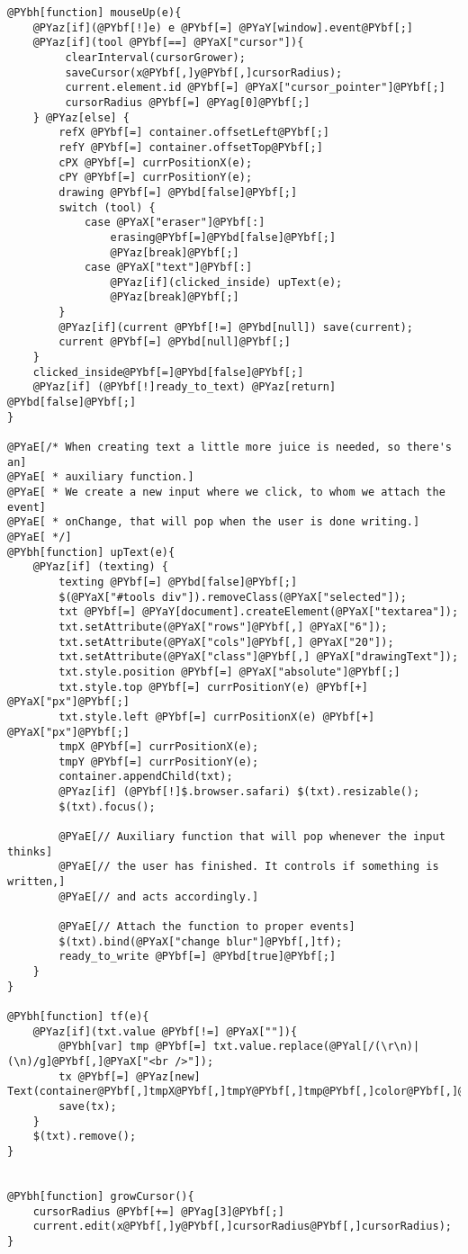 \begin{Verbatim}[commandchars=@\[\]]
@PYbh[function] mouseUp(e){
	@PYaz[if](@PYbf[!]e) e @PYbf[=] @PYaY[window].event@PYbf[;]
	@PYaz[if](tool @PYbf[==] @PYaX["cursor"]){
		 clearInterval(cursorGrower);
		 saveCursor(x@PYbf[,]y@PYbf[,]cursorRadius);
		 current.element.id @PYbf[=] @PYaX["cursor_pointer"]@PYbf[;]
		 cursorRadius @PYbf[=] @PYag[0]@PYbf[;]
	} @PYaz[else] {
    	refX @PYbf[=] container.offsetLeft@PYbf[;]
    	refY @PYbf[=] container.offsetTop@PYbf[;]
    	cPX @PYbf[=] currPositionX(e);
    	cPY @PYbf[=] currPositionY(e);
    	drawing @PYbf[=] @PYbd[false]@PYbf[;]
    	switch (tool) {
        	case @PYaX["eraser"]@PYbf[:]
            	erasing@PYbf[=]@PYbd[false]@PYbf[;]
            	@PYaz[break]@PYbf[;]
        	case @PYaX["text"]@PYbf[:]
				@PYaz[if](clicked_inside) upText(e);
            	@PYaz[break]@PYbf[;]
    	}
		@PYaz[if](current @PYbf[!=] @PYbd[null]) save(current);
		current @PYbf[=] @PYbd[null]@PYbf[;]
	}
	clicked_inside@PYbf[=]@PYbd[false]@PYbf[;]
	@PYaz[if] (@PYbf[!]ready_to_text) @PYaz[return] @PYbd[false]@PYbf[;]
}

@PYaE[/* When creating text a little more juice is needed, so there's an]
@PYaE[ * auxiliary function.]
@PYaE[ * We create a new input where we click, to whom we attach the event]
@PYaE[ * onChange, that will pop when the user is done writing.]
@PYaE[ */]
@PYbh[function] upText(e){
    @PYaz[if] (texting) {
		texting @PYbf[=] @PYbd[false]@PYbf[;]
		$(@PYaX["#tools div"]).removeClass(@PYaX["selected"]);
        txt @PYbf[=] @PYaY[document].createElement(@PYaX["textarea"]);
        txt.setAttribute(@PYaX["rows"]@PYbf[,] @PYaX["6"]);
		txt.setAttribute(@PYaX["cols"]@PYbf[,] @PYaX["20"]);
        txt.setAttribute(@PYaX["class"]@PYbf[,] @PYaX["drawingText"]);
        txt.style.position @PYbf[=] @PYaX["absolute"]@PYbf[;]
        txt.style.top @PYbf[=] currPositionY(e) @PYbf[+] @PYaX["px"]@PYbf[;]
        txt.style.left @PYbf[=] currPositionX(e) @PYbf[+] @PYaX["px"]@PYbf[;]
        tmpX @PYbf[=] currPositionX(e);
        tmpY @PYbf[=] currPositionY(e);
        container.appendChild(txt);
		@PYaz[if] (@PYbf[!]$.browser.safari) $(txt).resizable();
		$(txt).focus();
		
		@PYaE[// Auxiliary function that will pop whenever the input thinks]
		@PYaE[// the user has finished. It controls if something is written,]
		@PYaE[// and acts accordingly.]
		
		@PYaE[// Attach the function to proper events]
		$(txt).bind(@PYaX["change blur"]@PYbf[,]tf);
		ready_to_write @PYbf[=] @PYbd[true]@PYbf[;]
    }
}

@PYbh[function] tf(e){
	@PYaz[if](txt.value @PYbf[!=] @PYaX[""]){
		@PYbh[var] tmp @PYbf[=] txt.value.replace(@PYal[/(\r\n)|(\n)/g]@PYbf[,]@PYaX["<br />"]);
		tx @PYbf[=] @PYaz[new] Text(container@PYbf[,]tmpX@PYbf[,]tmpY@PYbf[,]tmp@PYbf[,]color@PYbf[,]@PYaX["30"]@PYbf[,]@PYaX[""]@PYbf[,]@PYaX["0"]);
		save(tx);
	} 
	$(txt).remove();
}


@PYbh[function] growCursor(){
	cursorRadius @PYbf[+=] @PYag[3]@PYbf[;]
	current.edit(x@PYbf[,]y@PYbf[,]cursorRadius@PYbf[,]cursorRadius);
}
\end{Verbatim}

